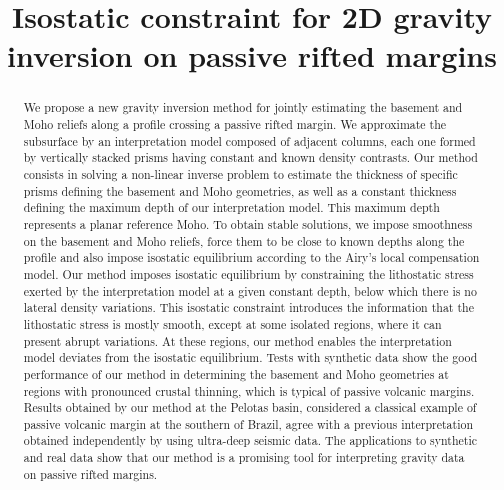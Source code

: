 \documentclass[manuscript]{geophysics}
\begin{document}
\title{Isostatic constraint for 2D gravity inversion on passive rifted margins}

\renewcommand{\thefootnote}{\fnsymbol{footnote}} 


%

\maketitle


\begin{abstract}

We propose a new gravity inversion method for jointly estimating the basement and 
Moho reliefs along a profile crossing a passive rifted margin.
We approximate the subsurface by an interpretation model composed of 
adjacent columns, each one formed by vertically stacked prisms having constant 
and known density contrasts.
Our method consists in solving a non-linear inverse problem to estimate the 
thickness of specific prisms defining the basement and Moho geometries, 
as well as a constant thickness defining the maximum depth of our interpretation 
model.
This maximum depth represents a planar reference Moho.
To obtain stable solutions, we impose smoothness on the basement and Moho reliefs,
force them to be close to known depths along the profile and also impose
isostatic equilibrium according to the Airy's local compensation model.
Our method imposes isostatic equilibrium by constraining the lithostatic stress 
exerted by the interpretation model at a given constant depth, 
below which there is no lateral density variations.
This isostatic constraint introduces the information that the lithostatic stress 
is mostly smooth, except at some isolated regions, where it can present abrupt 
variations. At these regions, our method enables the interpretation model deviates
from the isostatic equilibrium.
Tests with synthetic data show the good performance of our method in
determining the basement and Moho geometries at regions with  
pronounced crustal thinning, which is typical of passive volcanic margins.
Results obtained by our method at the Pelotas basin, considered a classical example
of passive volcanic margin at the southern of Brazil, agree with a previous
interpretation obtained independently by using ultra-deep seismic data.
The applications to synthetic and real data show that our method is a
promising tool for interpreting gravity data on passive rifted margins.


\end{abstract}
\end{document}

